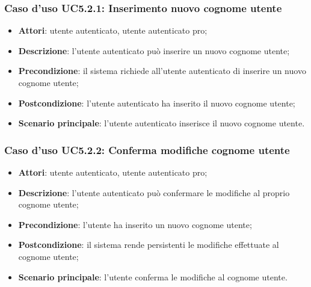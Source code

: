 \subsubsection{Caso d'uso UC5.2.1: Inserimento nuovo cognome utente}

\begin{itemize}
	\item \textbf{Attori}: utente autenticato, utente autenticato pro;
	\item \textbf{Descrizione}: l'utente autenticato può inserire un nuovo cognome utente;
	\item \textbf{Precondizione}:  il sistema richiede all'utente autenticato di inserire un nuovo cognome utente;
	\item \textbf{Postcondizione}:  l'utente autenticato ha inserito il nuovo cognome utente;
	\item \textbf{Scenario principale}: l'utente autenticato inserisce il nuovo cognome utente.
\end{itemize}

\subsubsection{Caso d'uso UC5.2.2: Conferma modifiche cognome utente}

\begin{itemize}
	\item \textbf{Attori}: utente autenticato, utente autenticato pro;
	\item \textbf{Descrizione}: l'utente autenticato può confermare le modifiche al proprio cognome utente;
	\item \textbf{Precondizione}: l'utente ha inserito un nuovo cognome utente;
	\item \textbf{Postcondizione}: il sistema rende persistenti le modifiche effettuate al cognome utente;
	\item \textbf{Scenario principale}: l'utente conferma le modifiche al cognome utente.
\end{itemize}

